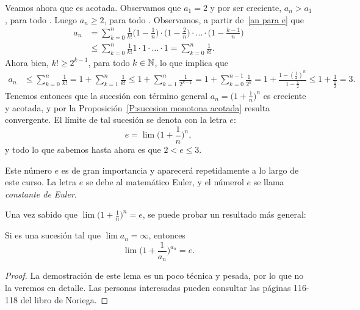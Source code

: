 Veamos ahora que es acotada. Observamos que $a_1 = 2$ y por ser creciente, $a_n > a_1$, para todo \niN. Luego $a_n \ge 2$, para todo \niN.
Observamos, a partir de~\eqref{an para e} que 
\begin{align*}
    a_n &= \sum_{k=0}^{n} \frac{1}{k!} \Big(1-\frac1{n}\Big) \cdot \Big(1-\frac2{n}\Big)  \cdot  \dots \cdot \Big(1-\frac{k-1}{n}\Big) \\
    &\le \sum_{k=0}^{n} \frac{1}{k!} 1 \cdot 1  \cdot  \dots \cdot 1 = \sum_{k=0}^{n} \frac{1}{k!}.
\end{align*}
Ahora bien, $k! \ge 2^{k-1}$, para todo $k\in\mathbb{N}$, lo que implica que
\begin{align*}
    a_n &\le \sum_{k=0}^{n} \frac{1}{k!}
    = 1 + \sum_{k=1}^{n} \frac{1}{k!}
    \le 1 + \sum_{k=1}^{n} \frac{1}{2^{k-1}}
    =  1 + \sum_{k=0}^{n-1} \frac{1}{2^k}
    = 1 + \frac{1-(\frac12)^n}{1-\frac12}
    \le 1 + \frac{1}{\frac12} = 3.
\end{align*}
Tenemos entonces que la sucesión \sucan con término general $a_n = \big(1+\frac1n\big)^n$ es creciente y acotada, y por la Proposición~\ref{P:sucesion monotona acotada} resulta convergente.
El límite de tal sucesión se denota con la letra $e$:
\begin{equation}\label{defi de e}
    e = \lim \Big(1+\frac1n\Big)^n,
\end{equation}
y todo lo que sabemos hasta ahora es que $2 < e \le 3$.

Este número $e$ es de gran importancia y aparecerá repetidamente a lo largo de este curso. La letra $e$ se debe al matemático Euler, y el númerol $e$ se llama \emph{constante de Euler}.

Una vez sabido que $\lim \big(1+\frac1n\big)^n = e$, se puede probar un resultado más general:
\begin{lemma}
    Si \sucan es una sucesión tal que $\lim a_n = \infty$, entonces
    \[
    \lim \Big(1+\frac1{a_n}\Big)^{a_n} = e.
    \]
\end{lemma}

\begin{proof}
La demostración de este lema es un poco técnica y pesada, por lo que no la veremos en detalle.
Las personas interesadas pueden consultar las páginas 116-118 del libro de Noriega.

\end{proof}

